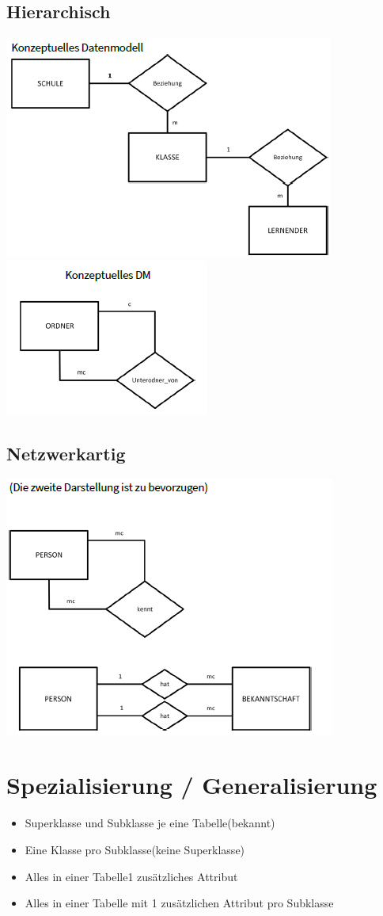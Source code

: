 \documentclass[a4paper,8pt]{article} %
\begin{document}
\begin{small}
\begin{minipage}{0.68 \linewidth}
		\subsection{Hierarchisch}
			\includegraphics[width=.5\linewidth]{hierarchie}
			\includegraphics[width=.5\linewidth]{hierarchie2}
		\subsection{Netzwerkartig}
			\includegraphics[width=.5\linewidth]{network}
	\end{minipage}
	\begin{minipage}{0.32 \linewidth}
		\section{Spezialisierung / Generalisierung}
			\begin{itemize}
				\item Superklasse und Subklasse je eine Tabelle(bekannt)
				\item Eine Klasse pro Subklasse(keine Superklasse)
				\item Alles in einer Tabelle1 zusätzliches Attribut
				\item Alles in einer Tabelle mit 1 zusätzlichen Attribut pro Subklasse
			\end{itemize}

\end{minipage}
\end{small}
\end{document}
